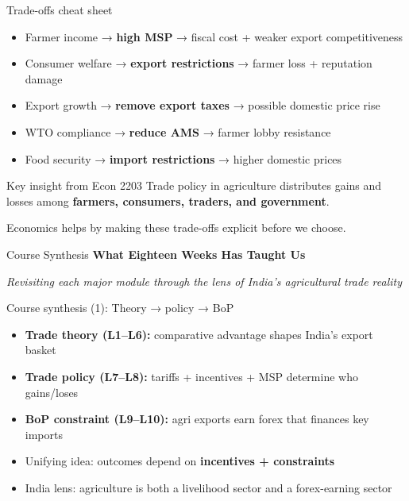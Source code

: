 \documentclass[
  ignorenonframetext,
  aspectratio=169,
]{beamer}
\makeatletter
\providecommand{\tightlist}{%
  \setlength{\itemsep}{0pt}\setlength{\parskip}{0pt}}
\let\quarto@originallabel\label
\DeclareRobustCommand*{\label}[1]{\quarto@originallabel{#1}}
\makeatother
\begin{document}
\begin{frame}
\begin{block}{Trade-offs cheat sheet}
\label{trade-offs-cheat-sheet}
\begin{itemize}
\tightlist
\item
  Farmer income → \textbf{high MSP} → fiscal cost + weaker export
  competitiveness
\item
  Consumer welfare → \textbf{export restrictions} → farmer loss +
  reputation damage
\item
  Export growth → \textbf{remove export taxes} → possible domestic price
  rise
\item
  WTO compliance → \textbf{reduce AMS} → farmer lobby resistance
\item
  Food security → \textbf{import restrictions} → higher domestic prices
\end{itemize}
\end{block}
\end{frame}

\begin{frame}
\begin{block}{Key insight from Econ 2203}
\label{key-insight-from-econ-2203}
Trade policy in agriculture distributes gains and losses among
\textbf{farmers, consumers, traders, and government}.

Economics helps by making these trade-offs explicit before we choose.
\end{block}
\end{frame}

\begin{frame}{Course Synthesis}
\label{course-synthesis}
\textbf{What Eighteen Weeks Has Taught Us}

\emph{Revisiting each major module through the lens of India's
agricultural trade reality}
\end{frame}

\begin{frame}
\begin{block}{Course synthesis (1): Theory → policy → BoP}
\label{course-synthesis-1-theory-policy-bop}
\begin{itemize}
\tightlist
\item
  \textbf{Trade theory (L1--L6):} comparative advantage shapes India's
  export basket
\item
  \textbf{Trade policy (L7--L8):} tariffs + incentives + MSP determine
  who gains/loses
\item
  \textbf{BoP constraint (L9--L10):} agri exports earn forex that
  finances key imports
\item
  Unifying idea: outcomes depend on \textbf{incentives + constraints}
\item
  India lens: agriculture is both a livelihood sector and a
  forex-earning sector
\end{itemize}
\end{block}
\end{frame}
\end{document}
